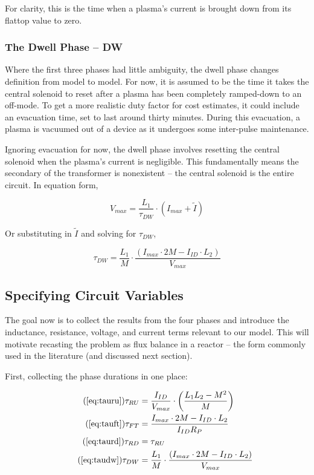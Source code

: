 For clarity, this is the time when a plasma's current is brought down from its flattop value to zero.

\subsubsection{The Dwell Phase -- DW}

Where the first three phases had little ambiguity, the dwell phase changes definition from model to model. For now, it is assumed to be the time it takes the central solenoid to reset after a plasma has been completely ramped-down to an off-mode. To get a more realistic duty factor for cost estimates, it could include an evacuation time, set to last around thirty minutes. During this evacuation, a plasma is vacuumed out of a device as it undergoes some inter-pulse maintenance.

Ignoring evacuation for now, the dwell phase involves resetting the central solenoid when the plasma's current is negligible. This fundamentally means the secondary of the transformer is nonexistent -- the central solenoid is the entire circuit. In equation form,

\begin{equation}
	V_{max} = \frac{L_1}{\tau_{DW}} \cdot \left( I_{max} + \tilde I \right) 
\end{equation}

Or substituting in $\tilde I$ and solving for $\tau_{DW}$,

\begin{equation}
	\label{eq:taudw}
	\tau_{DW} = \frac{L_1}{M} \cdot \frac{ \left( I_{max} \cdot 2 M - I_{ID} \cdot  L_2 \right) }{V_{max}}
\end{equation}

\subsection{Specifying Circuit Variables}

The goal now is to collect the results from the four phases and introduce the inductance, resistance, voltage, and current terms relevant to our model. This will motivate recasting the problem as flux balance in a reactor -- the form commonly used in the literature (and discussed next section).

First, collecting the phase durations in one place:

\begin{align}
	\tag{\ref{eq:tauru}}
	\tau_{RU} &= \frac{I_{ID}}{V_{max}} \cdot \left( \frac{ L_1 L_2 - M^2 }{ M } \right) \\
	\tag{\ref{eq:tauft}}
	\tau_{FT} &= \frac{ I_{max} \cdot 2 M - I_{ID} \cdot  L_2 }{I_{ID} R_P} \\
	\tag{\ref{eq:taurd}}
	\tau_{RD} &= \tau_{RU} \\
	\tag{\ref{eq:taudw}}
	\tau_{DW} &= \frac{L_1}{M} \cdot \frac{ \left( I_{max} \cdot 2 M - I_{ID} \cdot  L_2 \right) }{V_{max}}
\end{align}

